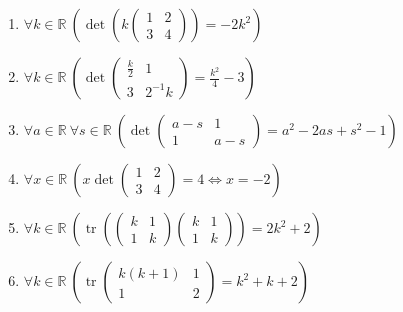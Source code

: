 \documentclass[11pt,a4paper]{article}
\begin{document}
\begin{enumerate}
\item $\displaystyle \forall k \in \mathbb{R}\ \left( \det\left( k \begin{pmatrix} 1 & 2 \\ 3 & 4 \end{pmatrix} \right) = -2k^{2} \right)$
\item $\displaystyle \forall k \in \mathbb{R}\ \left( \det \begin{pmatrix} \frac{k}{2} & 1 \\ 3 & 2^{-1} k \end{pmatrix} = \frac{k^{2}}{4} - 3 \right)$
\item $\displaystyle \forall a \in \mathbb{R}\ \forall s \in \mathbb{R}\ \left( \det \begin{pmatrix} a - s & 1 \\ 1 & a - s \end{pmatrix} = a^{2} - 2as + s^{2} - 1 \right)$
\item $\displaystyle \forall x \in \mathbb{R}\ \left( x \det \begin{pmatrix} 1 & 2 \\ 3 & 4 \end{pmatrix} = 4 \iff x = -2 \right)$
\item $\displaystyle \forall k \in \mathbb{R}\ \left( \operatorname{tr}\left( \begin{pmatrix} k & 1 \\ 1 & k \end{pmatrix} \begin{pmatrix} k & 1 \\ 1 & k \end{pmatrix} \right) = 2k^{2} + 2 \right)$
\item $\displaystyle \forall k \in \mathbb{R}\ \left( \operatorname{tr} \begin{pmatrix} k(k + 1) & 1 \\ 1 & 2 \end{pmatrix} = k^{2} + k + 2 \right)$
\end{enumerate}
\end{document}

